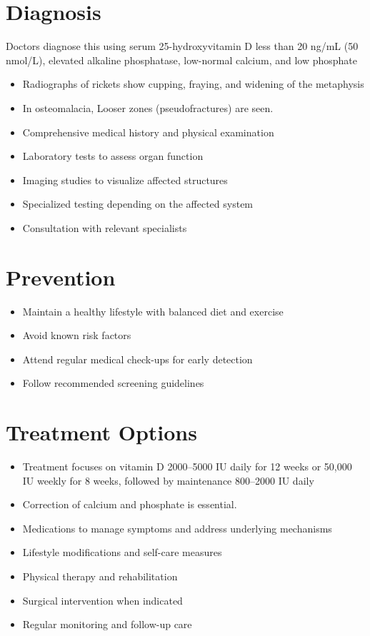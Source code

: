 \section{Diagnosis}
Doctors diagnose this using serum 25-hydroxyvitamin D less than 20 ng/mL (50 nmol/L), elevated alkaline phosphatase, low-normal calcium, and low phosphate

\begin{itemize}[noitemsep]
  \item Radiographs of rickets show cupping, fraying, and widening of the metaphysis
  \item In osteomalacia, Looser zones (pseudofractures) are seen.
  \item Comprehensive medical history and physical examination
  \item Laboratory tests to assess organ function
  \item Imaging studies to visualize affected structures
  \item Specialized testing depending on the affected system
  \item Consultation with relevant specialists
\end{itemize}
\section{Prevention}
\begin{itemize}[noitemsep]
  \item Maintain a healthy lifestyle with balanced diet and exercise
  \item Avoid known risk factors
  \item Attend regular medical check-ups for early detection
  \item Follow recommended screening guidelines
\end{itemize}
\section{Treatment Options}
\begin{itemize}[noitemsep]
  \item Treatment focuses on vitamin D 2000--5000 IU daily for 12 weeks or 50,000 IU weekly for 8 weeks, followed by maintenance 800--2000 IU daily
  \item Correction of calcium and phosphate is essential.
  \item Medications to manage symptoms and address underlying mechanisms
  \item Lifestyle modifications and self-care measures
  \item Physical therapy and rehabilitation
  \item Surgical intervention when indicated
  \item Regular monitoring and follow-up care
\end{itemize}
